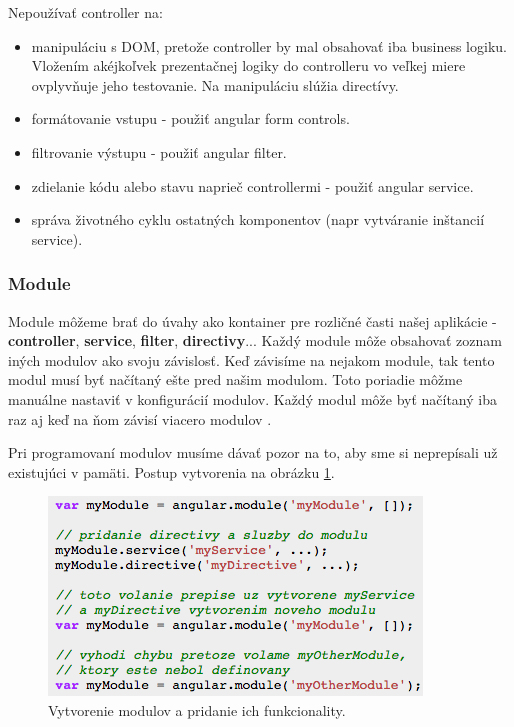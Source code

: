 \noindent Nepoužívať controller na:
\begin{itemize}
\item manipuláciu s DOM, pretože controller by mal obsahovať iba business logiku. Vložením akéjkoľvek prezentačnej logiky do controlleru vo veľkej miere ovplyvňuje jeho testovanie. Na manipuláciu slúžia directívy.
\item formátovanie vstupu - použiť angular form controls.
\item filtrovanie výstupu - použiť angular filter.
\item zdielanie kódu alebo stavu naprieč controllermi - použiť angular service.
\item správa životného cyklu ostatných komponentov (napr vytváranie inštancií service).
\end{itemize}


\subsubsection{Module}
Module môžeme brať do úvahy ako kontainer pre rozličné časti našej aplikácie - \textbf{controller}, \textbf{service}, \textbf{filter}, \textbf{directivy}... Každý module môže obsahovať zoznam iných modulov ako svoju závislosť. Keď závisíme na nejakom module, tak tento modul musí byť načítaný ešte pred našim modulom. Toto poriadie môžme manuálne nastaviť v konfigurácií modulov. Každý modul môže byť načítaný iba raz aj keď na ňom závisí viacero modulov \cite{angular-docs}.

Pri programovaní modulov musíme dávať pozor na to, aby sme si neprepísali už existujúci v pamäti. Postup vytvorenia na obrázku \ref{img-angular-module-def}.

\begin{figure}[H]
  \centering
  \includegraphics[scale=0.8]{img/code/angular-module.png}
  \caption{Vytvorenie modulov a pridanie ich funkcionality.}
  \label{img-angular-module-def}
\end{figure}

